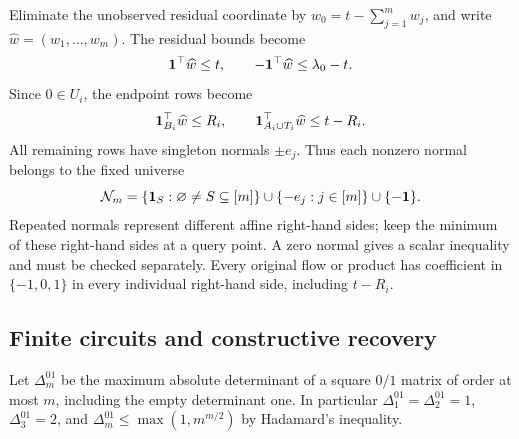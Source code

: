 Eliminate the unobserved residual coordinate by
$w_0=t-\sum_{j=1}^mw_j$, and write $\widehat w=(w_1,\ldots,w_m)$.
The residual bounds become
\begin{equation}\label{eq:chain-residual-reduced}
 \mathbf 1^\top\widehat w\le t,\qquad
 -\mathbf 1^\top\widehat w\le\lambda_0-t.
\end{equation}
Since $0\in U_i$, the endpoint rows become
\begin{equation}\label{eq:chain-endpoints-reduced}
 \mathbf 1_{B_i}^\top\widehat w\le R_i,\qquad
 \mathbf 1_{A_i\cup T_i}^\top\widehat w\le t-R_i.
\end{equation}
All remaining rows have singleton normals $\pm e_j$.
Thus each nonzero normal belongs to the fixed universe
\begin{equation}\label{eq:chain-normal-universe}
 \mathcal N_m=\{\mathbf 1_S:\varnothing\ne S\subseteq[m]\}
                 \cup\{-e_j:j\in[m]\}\cup\{-\mathbf 1\}.
\end{equation}
Repeated normals represent different affine right-hand sides; keep
the minimum of these right-hand sides at a query point. A zero
normal gives a scalar inequality and must be checked separately.
Every original flow or product has coefficient in $\{-1,0,1\}$
in every individual right-hand side, including $t-R_i$.

\subsection{Finite circuits and constructive recovery}

Let $\Delta^{01}_m$ be the maximum absolute determinant of a square
$0/1$ matrix of order at most $m$, including the empty determinant
one. In particular $\Delta^{01}_1=\Delta^{01}_2=1$, $\Delta^{01}_3=2$, and
$\Delta^{01}_m\le\max(1,m^{m/2})$ by Hadamard's inequality.

